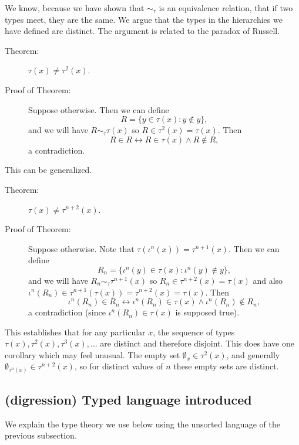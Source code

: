 \documentclass[12pt]{book}
\begin{document}
We know, because we have shown that $\sim_\tau$ is an equivalence relation, that if two types meet, they are the same.  We argue that the types in the hierarchies we have defined are distinct.  The argument is related to the paradox of Russell.

\begin{description}

\item[Theorem:]  $\tau(x) \neq \tau^2(x)$.

\item[Proof of Theorem:]  Suppose otherwise.  Then we can define $$R = \{y \in \tau(x):y \not\in y\},$$ and we will have $R \sim_\tau \tau(x)$ so $R \in \tau^2(x) = \tau(x)$.
Then $$R \in R \leftrightarrow R \in \tau(x) \wedge R \not\in R,$$ a contradiction.

\end{description}

This can be generalized.

\begin{description}

\item[Theorem:]  $\tau(x) \neq \tau^{n+2}(x)$.

\item[Proof of Theorem:]  Suppose otherwise.  Note that $\tau(\iota^n(x)) = \tau^{n+1}(x)$.  Then we can define $$R_n = \{\iota^n(y) \in \tau(x):\iota^n(y) \not\in y\},$$ and we will have $R_n \sim_\tau \tau^{n+1}(x)$ so $R_n \in \tau^{n+2}(x) = \tau(x)$ and also $\iota^n(R_n) \in \tau^{n+1}(\tau(x)) = \tau^{n+2}(x) = \tau(x)$.
Then $$\iota^n(R_n) \in R_n \leftrightarrow \iota^n(R_n) \in \tau(x) \wedge \iota^n(R_n) \not\in R_n,$$ a contradiction (since $\iota^n(R_n) \in \tau(x)$ is supposed true). 

\end{description}

This establishes that for any particular $x$, the sequence of types $\tau(x), \tau^2(x),\tau^3(x),\ldots$ are distinct and therefore disjoint.  This does have one corollary which may feel unusual.  The empty set $\emptyset_x \in \tau^2(x)$, and generally $\emptyset_{\tau^n(x)} \in \tau^{n+2}(x)$, so for distinct values of $n$ these empty sets are distinct.

\subsection{ (digression) Typed language introduced}

We explain the type theory we use below using the unsorted language of the previous subsection.
\end{document}
